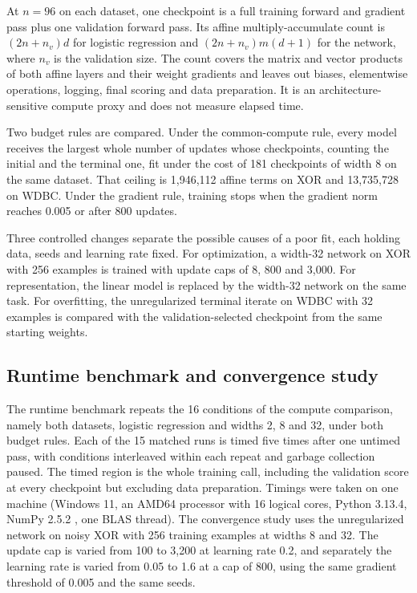 \documentclass[11pt]{article}
\begin{document}
At $n=96$ on each dataset, one checkpoint is a full training forward and gradient pass plus one validation forward pass. Its affine multiply-accumulate count is $(2n+n_v)d$ for logistic regression and $(2n+n_v)m(d+1)$ for the network, where $n_v$ is the validation size. The count covers the matrix and vector products of both affine layers and their weight gradients and leaves out biases, elementwise operations, logging, final scoring and data preparation. It is an architecture-sensitive compute proxy and does not measure elapsed time.

Two budget rules are compared. Under the common-compute rule, every model receives the largest whole number of updates whose checkpoints, counting the initial and the terminal one, fit under the cost of 181 checkpoints of width 8 on the same dataset. That ceiling is 1,946,112 affine terms on XOR and 13,735,728 on WDBC. Under the gradient rule, training stops when the gradient norm reaches 0.005 or after 800 updates.

Three controlled changes separate the possible causes of a poor fit, each holding data, seeds and learning rate fixed. For optimization, a width-32 network on XOR with 256 examples is trained with update caps of 8, 800 and 3,000. For representation, the linear model is replaced by the width-32 network on the same task. For overfitting, the unregularized terminal iterate on WDBC with 32 examples is compared with the validation-selected checkpoint from the same starting weights.

\subsection{Runtime benchmark and convergence study}

The runtime benchmark repeats the 16 conditions of the compute comparison, namely both datasets, logistic regression and widths 2, 8 and 32, under both budget rules. Each of the 15 matched runs is timed five times after one untimed pass, with conditions interleaved within each repeat and garbage collection paused. The timed region is the whole training call, including the validation score at every checkpoint but excluding data preparation. Timings were taken on one machine (Windows 11, an AMD64 processor with 16 logical cores, Python 3.13.4, NumPy 2.5.2 \cite{numpy}, one BLAS thread). The convergence study uses the unregularized network on noisy XOR with 256 training examples at widths 8 and 32. The update cap is varied from 100 to 3,200 at learning rate 0.2, and separately the learning rate is varied from 0.05 to 1.6 at a cap of 800, using the same gradient threshold of 0.005 and the same seeds.
\end{document}
